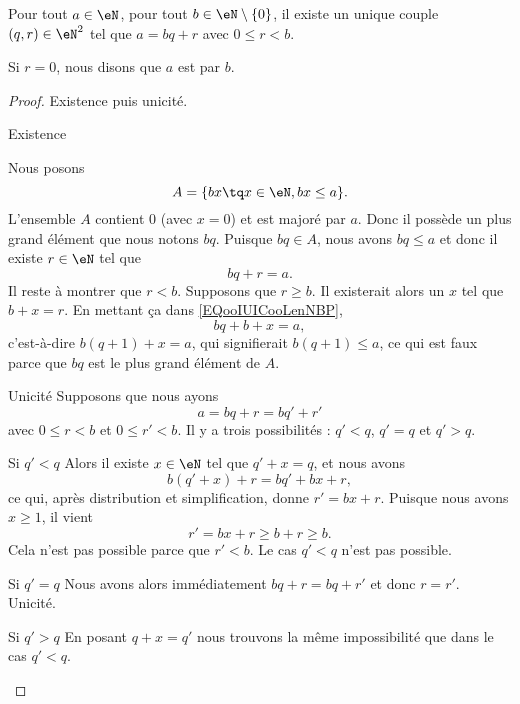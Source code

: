 \begin{theorem}       \label{THOooKDJVooRIJRHP}
    Pour tout \( a\in \eN\), pour tout \( b\in \eN\setminus\{ 0 \}\), il existe un unique couple \( (q,r)\in \eN^2\) tel que \( a=bq+r\) avec \( 0\leq r<b\).

    Si \( r=0\), nous disons que \( a\) est  par \( b\).
\end{theorem}

\begin{proof}
    Existence puis unicité.
    \begin{subproof}
    \item[Existence]
    
    Nous posons
    \begin{equation}
        A=\{ bx\tq x\in \eN,bx\leq a \}.
    \end{equation}
    L'ensemble \( A\) contient \( 0\) (avec \( x=0\)) et est majoré par \( a\). Donc il possède un plus grand élément que nous notons \( bq\). Puisque \( bq\in A\), nous avons \( bq\leq a\) et donc il existe \( r\in \eN\) tel que
    \begin{equation}        \label{EQooIUICooLenNBP}
        bq+r=a.
    \end{equation}
    Il reste à montrer que \( r<b\). Supposons que \( r\geq b\). Il existerait alors un \( x\) tel que \( b+x=r\). En mettant ça dans \eqref{EQooIUICooLenNBP},
    \begin{equation}
        bq+b+x=a,
    \end{equation}
    c'est-à-dire \( b(q+1)+x=a\), qui signifierait \( b(q+1)\leq a\), ce qui est faux parce que \( bq\) est le plus grand élément de \( A\).
\item[Unicité]
    Supposons que nous ayons
    \begin{equation}
        a=bq+r=bq'+r'
    \end{equation}
    avec \( 0\leq r<b\) et \( 0\leq r'<b\). Il y a trois possibilités : \( q'<q\), \( q'=q\) et \( q'>q\).
    \begin{subproof}
    \item[Si \( q'<q\)]
        Alors il existe \( x\in \eN\) tel que \( q'+x=q\), et nous avons
        \begin{equation}
            b(q'+x)+r=bq'+bx+r,
        \end{equation}
        ce qui, après distribution et simplification, donne \( r'=bx+r\). Puisque nous avons \( x\geq 1\), il vient
        \begin{equation}
            r'=bx+r\geq b+r\geq b.
        \end{equation}
        Cela n'est pas possible parce que \( r'<b\). Le cas \( q'<q\) n'est pas possible.
    \item[Si \( q'=q\)]
        Nous avons alors immédiatement \( bq+r=bq+r'\) et donc \( r=r'\). Unicité.
    \item[Si \( q'>q\)]
        En posant \( q+x=q'\) nous trouvons la même impossibilité que dans le cas \( q'<q\).
    \end{subproof}
    \end{subproof}
\end{proof}

